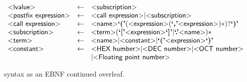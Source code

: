 \begin{figure}
\[\begin{array}{lcl}
  \pgrammar{lvalue} & \gets & \pgrammar{subscription}\\

  \pgrammar{postfix expression} & \gets & \pgrammar{call expression} | \pgrammar{subscription}\\

  \pgrammar{call expression} & \gets & \pgrammar{name} \plexer{(}
  (\pgrammar{expression} (\plexer{,} \pgrammar{expression})*)?
  \plexer{)}\\

  \pgrammar{subscription} & \gets & \pgrammar{term} (\plexer{[} \pgrammar{expression} \plexer{]} |
                                                     \plexer{.} \pgrammar{name})*\\

  \pgrammar{term} & \gets & \pgrammar{name} | \pgrammar{constant} | \plexer{(} \pgrammar{expression} \plexer{)}\\

  \pgrammar{constant} & \gets & \pgrammar{HEX humber} | \pgrammar{DEC number} | \pgrammar{OCT number}\\&&
  | \pgrammar{Floating point number}\\
\end{array}
\]
  \caption {\pencil{} syntax as an EBNF continued overleaf.}
\end{figure}

